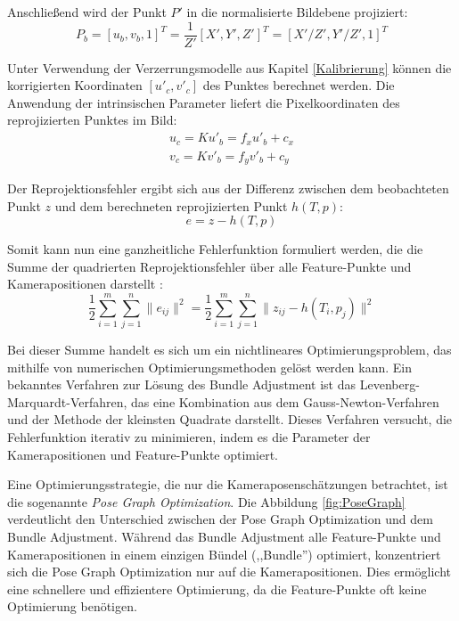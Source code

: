 Anschließend wird der Punkt \( P' \) in die normalisierte Bildebene projiziert:
\begin{equation}
    P_b = [u_b, v_b, 1]^T = \frac{1}{Z'}[X', Y', Z']^T = [X'/Z', Y'/Z', 1]^T
\end{equation}

Unter Verwendung der Verzerrungsmodelle aus Kapitel \ref{Kalibrierung} können die korrigierten Koordinaten \( [u'_c, v'_c] \) des Punktes berechnet werden. Die Anwendung der intrinsischen Parameter liefert die Pixelkoordinaten des reprojizierten Punktes im Bild:
\begin{equation}
    \begin{aligned}
        u_c = Ku'_b = f_xu'_b + c_x \\
        v_c = Kv'_b = f_yv'_b + c_y
    \end{aligned}
\end{equation}

Der Reprojektionsfehler ergibt sich aus der Differenz zwischen dem beobachteten Punkt \( z \) und dem berechneten reprojizierten Punkt \( h(T,p) \):
\begin{equation}
    e = z - h(T,p)
\end{equation}

Somit kann nun eine ganzheitliche Fehlerfunktion formuliert werden, die die Summe der quadrierten Reprojektionsfehler über alle Feature-Punkte und Kamerapositionen darstellt \cite{gao2021vSLAM}:
\begin{equation}
    \frac{1}{2} \sum_{i=1}^{m} \sum_{j=1}^{n} \| e_{ij} \|^2 = \frac{1}{2} \sum_{i=1}^{m} \sum_{j=1}^{n} \| z_{ij} - h(T_i, p_j) \|^2
\end{equation}

Bei dieser Summe handelt es sich um ein nichtlineares Optimierungsproblem, das mithilfe von numerischen Optimierungsmethoden gelöst werden kann. Ein bekanntes Verfahren zur Lösung des Bundle Adjustment ist das Levenberg-Marquardt-Verfahren, das eine Kombination aus dem Gauss-Newton-Verfahren und der Methode der kleinsten Quadrate darstellt. Dieses Verfahren versucht, die Fehlerfunktion iterativ zu minimieren, indem es die Parameter der Kamerapositionen und Feature-Punkte optimiert. \cite{gao2021vSLAM, levenberg2024minimization}

Eine Optimierungsstrategie, die nur die Kameraposenschätzungen betrachtet, ist die sogenannte \emph{Pose Graph Optimization}. Die Abbildung \ref{fig:PoseGraph} verdeutlicht den Unterschied zwischen der Pose Graph Optimization und dem Bundle Adjustment. Während das Bundle Adjustment alle Feature-Punkte und Kamerapositionen in einem einzigen Bündel (,,Bundle'') optimiert, konzentriert sich die Pose Graph Optimization nur auf die Kamerapositionen. Dies ermöglicht eine schnellere und effizientere Optimierung, da die Feature-Punkte oft keine Optimierung benötigen. \cite{gao2021vSLAM}

